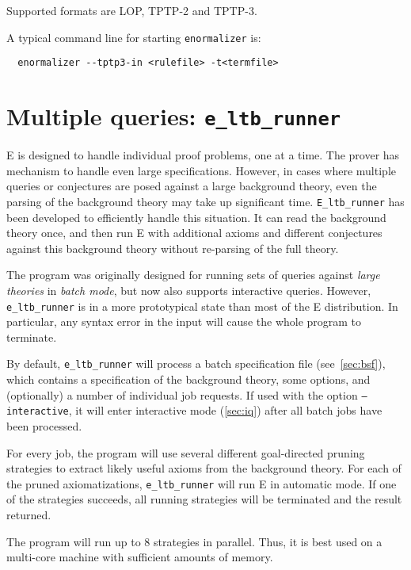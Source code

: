 \documentclass{report}
\begin{document}
Supported formats are LOP, TPTP-2 and TPTP-3.

A typical command line for starting \texttt{enormalizer} is:

\begin{verbatim}
  enormalizer --tptp3-in <rulefile> -t<termfile>
\end{verbatim}


\section{Multiple queries: \texttt{e\_ltb\_runner}}

E is designed to handle individual proof problems, one at a time. The
prover has mechanism to handle even large specifications. However, in
cases where multiple queries or conjectures are posed against a large
background theory, even the parsing of the background theory may take
up significant time. \texttt{E\_ltb\_runner} has been developed to
efficiently handle this situation. It can read the background theory
once, and then run E with additional axioms and different conjectures
against this background theory without re-parsing of the full theory.

The program was originally designed for running sets of queries
against \emph{large theories} in \emph{batch mode}, but now also
supports interactive queries. However, \texttt{e\_ltb\_runner} is in a
more prototypical state than most of the E distribution. In
particular, any syntax error in the input will cause the whole program
to terminate.

By default, \texttt{e\_ltb\_runner} will process a batch specification
file (see~\ref{sec:bsf}), which contains a specification of the
background theory, some options, and (optionally) a number of
individual job requests. If used with the option
\texttt{--interactive}, it will enter interactive mode (\ref{sec:iq})
after all batch jobs have been processed.

For every job, the program will use several different goal-directed
pruning strategies to extract likely useful axioms from the background
theory. For each of the pruned axiomatizations,
\texttt{e\_ltb\_runner} will run E in automatic mode. If one of the
strategies succeeds, all running strategies will be terminated and the
result returned.

The program will run up to 8 strategies in parallel. Thus, it is best
used on a multi-core machine with sufficient amounts of memory.
\end{document}
